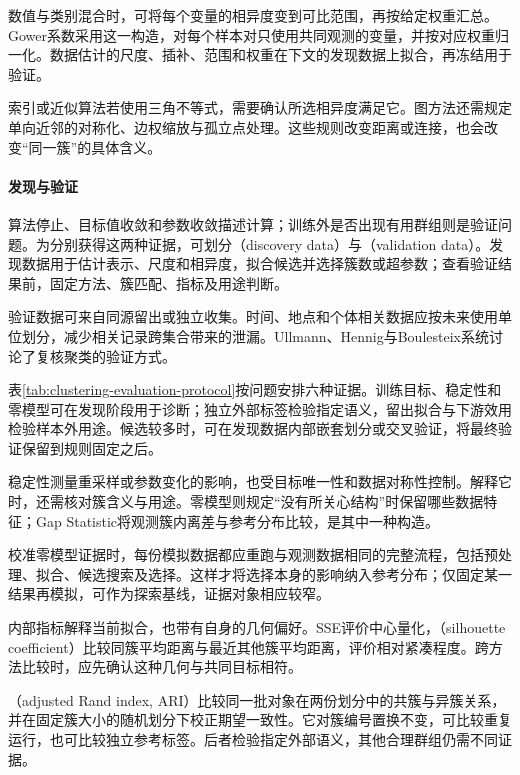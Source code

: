 数值与类别混合时，可将每个变量的相异度变到可比范围，再按给定权重汇总。Gower系数采用这一构造，对每个样本对只使用共同观测的变量，并按对应权重归一化。数据估计的尺度、插补、范围和权重在下文的发现数据上拟合，再冻结用于验证。

索引或近似算法若使用三角不等式，需要确认所选相异度满足它。图方法还需规定单向近邻的对称化、边权缩放与孤立点处理。这些规则改变距离或连接，也会改变“同一簇”的具体含义。

\paragraph{发现与验证}
算法停止、目标值收敛和参数收敛描述计算；训练外是否出现有用群组则是验证问题。为分别获得这两种证据，可划分（discovery data）与（validation data）。发现数据用于估计表示、尺度和相异度，拟合候选并选择簇数或超参数；查看验证结果前，固定方法、簇匹配、指标及用途判断。

验证数据可来自同源留出或独立收集。时间、地点和个体相关数据应按未来使用单位划分，减少相关记录跨集合带来的泄漏。Ullmann、Hennig与Boulesteix系统讨论了复核聚类的验证方式。

表\ref{tab:clustering-evaluation-protocol}按问题安排六种证据。训练目标、稳定性和零模型可在发现阶段用于诊断；独立外部标签检验指定语义，留出拟合与下游效用检验样本外用途。候选较多时，可在发现数据内部嵌套划分或交叉验证，将最终验证保留到规则固定之后。

稳定性测量重采样或参数变化的影响，也受目标唯一性和数据对称性控制。解释它时，还需核对簇含义与用途。零模型则规定“没有所关心结构”时保留哪些数据特征；Gap Statistic将观测簇内离差与参考分布比较，是其中一种构造。

校准零模型证据时，每份模拟数据都应重跑与观测数据相同的完整流程，包括预处理、拟合、候选搜索及选择。这样才将选择本身的影响纳入参考分布；仅固定某一结果再模拟，可作为探索基线，证据对象相应较窄。

内部指标解释当前拟合，也带有自身的几何偏好。SSE评价中心量化，（silhouette coefficient）比较同簇平均距离与最近其他簇平均距离，评价相对紧凑程度。跨方法比较时，应先确认这种几何与共同目标相符。

（adjusted Rand index, ARI）比较同一批对象在两份划分中的共簇与异簇关系，并在固定簇大小的随机划分下校正期望一致性。它对簇编号置换不变，可比较重复运行，也可比较独立参考标签。后者检验指定外部语义，其他合理群组仍需不同证据。

